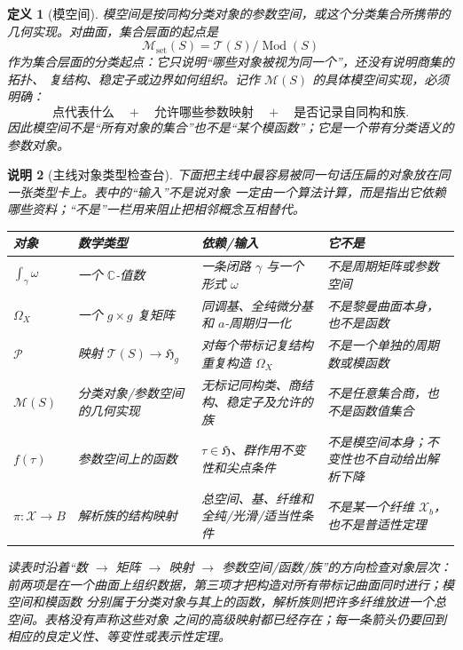 \documentclass[UTF8,fontset=none,a4paper,11pt]{ctexart}
\theoremstyle{foundation-definition}
\newtheorem{definition}{定义}[section]
\theoremstyle{foundation-theorem}
\theoremstyle{foundation-proposition}
\theoremstyle{foundation-example}
\theoremstyle{foundation-remark}
\newtheorem{remark}[definition]{说明}
\theoremstyle{foundation-theorem}
\newcommand{\T}{\mathcal T}
\newcommand{\M}{\mathcal M}
\newcommand{\Mod}{\operatorname{Mod}}
\begin{document}
\begin{definition}[模空间]\label{def:moduli}
模空间是按同构分类对象的参数空间，或这个分类集合所携带的几何实现。对曲面，集合层面的起点是
\[
\M_{\mathrm{set}}(S)=\T(S)/\Mod(S)
\]
作为集合层面的分类起点：它只说明“哪些对象被视为同一个”，还没有说明商集的拓扑、
复结构、稳定子或边界如何组织。记作 \(\M(S)\) 的具体模空间实现，必须明确：
\[
\text{点代表什么}\quad+\quad\text{允许哪些参数映射}\quad+\quad
\text{是否记录自同构和族}.
\]
因此模空间不是“所有对象的集合”也不是“某个模函数”；它是一个带有分类语义的参数对象。
\end{definition}

\begin{remark}[主线对象类型检查台]\label{rem:core-object-type-card}
下面把主线中最容易被同一句话压扁的对象放在同一张类型卡上。表中的“输入”不是说对象
一定由一个算法计算，而是指出它依赖哪些资料；“不是”一栏用来阻止把相邻概念互相替代。
\begin{center}
\small
\begin{tabularx}{\textwidth}{p{}p{}p{}X}
\toprule
对象 & 数学类型 & 依赖/输入 & 它不是 \\
\midrule
\(\int_\gamma\omega\) & 一个 \(\mathbb C\)-值数 & 一条闭路 \(\gamma\) 与一个形式 \(\omega\) & 不是周期矩阵或参数空间 \\
\(\Omega_X\) & 一个 \(g\times g\) 复矩阵 & 同调基、全纯微分基和 \(a\)-周期归一化 & 不是黎曼曲面本身，也不是函数 \\
\(\mathcal P\) & 映射 \(\T(S)\to\mathfrak H_g\) & 对每个带标记复结构重复构造 \(\Omega_X\) & 不是一个单独的周期数或模函数 \\
\(\M(S)\) & 分类对象/参数空间的几何实现 & 无标记同构类、商结构、稳定子及允许的族 & 不是任意集合商，也不是函数值集合 \\
\(f(\tau)\) & 参数空间上的函数 & \(\tau\in\mathfrak H\)、群作用不变性和尖点条件 & 不是模空间本身；不变性也不自动给出解析下降 \\
\(\pi:\mathcal X\to B\) & 解析族的结构映射 & 总空间、基、纤维和全纯/光滑/适当性条件 & 不是某一个纤维 \(\mathcal X_b\)，也不是普适性定理 \\
\bottomrule
\end{tabularx}
\end{center}
读表时沿着“数 \(\to\) 矩阵 \(\to\) 映射 \(\to\) 参数空间/函数/族”的方向检查对象层次：
前两项是在一个曲面上组织数据，第三项才把构造对所有带标记曲面同时进行；模空间和模函数
分别属于分类对象与其上的函数，解析族则把许多纤维放进一个总空间。表格没有声称这些对象
之间的高级映射都已经存在；每一条箭头仍要回到相应的良定义性、等变性或表示性定理。
\end{remark}
\end{document}
